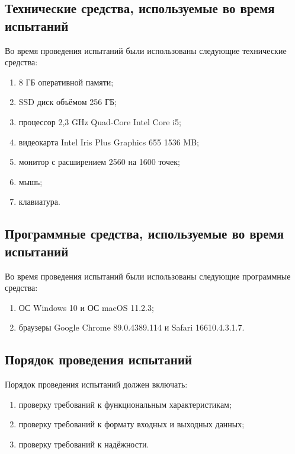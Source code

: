 \documentclass{../includes/TechDocMultiAuthors}
\begin{document}
    \subsection{Технические средства, используемые во время испытаний}

    Во время проведения испытаний были использованы следующие технические средства:

    \begin{enumerate}
        \item 8 ГБ оперативной памяти;
        \item SSD диск объёмом 256 ГБ;
        \item процессор 2,3 GHz Quad-Core Intel Core i5;
        \item видеокарта Intel Iris Plus Graphics 655 1536 MB;
        \item монитор с расширением 2560 на 1600 точек;
        \item мышь;
        \item клавиатура.
    \end{enumerate}

    \subsection{Программные средства, используемые во время испытаний}

    Во время проведения испытаний были использованы следующие программные средства:
    
    \begin{enumerate}
        \item ОС Windows 10 и ОС macOS 11.2.3;
        \item браузеры Google Chrome 89.0.4389.114 и Safari 16610.4.3.1.7.
    \end{enumerate}

    \subsection{Порядок проведения испытаний}

    Порядок проведения испытаний должен включать:

    \begin{enumerate}
        \item проверку требований к функциональным характеристикам;
        \item проверку требований к формату входных и выходных данных;
        \item проверку требований к надёжности.
    \end{enumerate}
\end{document}
